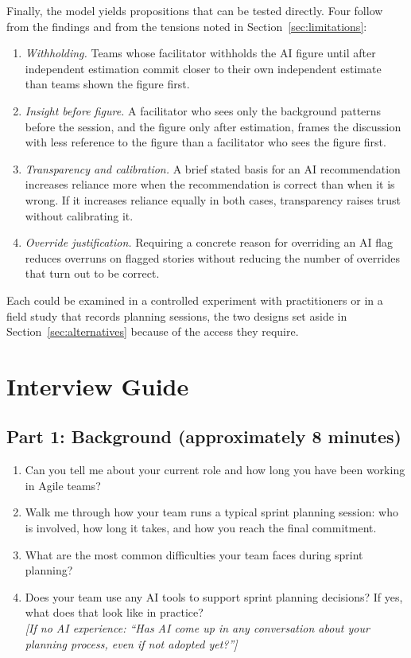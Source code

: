 \documentclass[a4paper,twoside]{bth}
\begin{document}
Finally, the model yields propositions that can be tested directly. Four follow from the findings and from the tensions noted in Section~\ref{sec:limitations}:
\begin{enumerate}
  \item \textit{Withholding.} Teams whose facilitator withholds the AI figure until after independent estimation commit closer to their own independent estimate than teams shown the figure first.
  \item \textit{Insight before figure.} A facilitator who sees only the background patterns before the session, and the figure only after estimation, frames the discussion with less reference to the figure than a facilitator who sees the figure first.
  \item \textit{Transparency and calibration.} A brief stated basis for an AI recommendation increases reliance more when the recommendation is correct than when it is wrong. If it increases reliance equally in both cases, transparency raises trust without calibrating it.
  \item \textit{Override justification.} Requiring a concrete reason for overriding an AI flag reduces overruns on flagged stories without reducing the number of overrides that turn out to be correct.
\end{enumerate}
Each could be examined in a controlled experiment with practitioners or in a field study that records planning sessions, the two designs set aside in Section~\ref{sec:alternatives} because of the access they require.






\appendix

\chapter{Interview Guide}
\label{app:interview}

\section*{Part 1: Background (approximately 8 minutes)}

\begin{enumerate}
  \item Can you tell me about your current role and how long you have been working in Agile teams?
  \item Walk me through how your team runs a typical sprint planning session: who is involved, how long it takes, and how you reach the final commitment.
  \item What are the most common difficulties your team faces during sprint planning?
  \item Does your team use any AI tools to support sprint planning decisions? If yes, what does that look like in practice?\\
  \textit{[If no AI experience: ``Has AI come up in any conversation about your planning process, even if not adopted yet?'']}
\end{enumerate}
\end{document}
